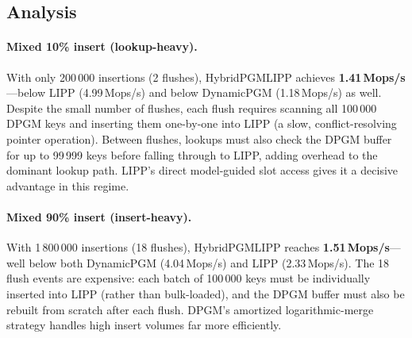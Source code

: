 \documentclass[11pt]{article}
\begin{document}
\subsection*{Analysis}

\paragraph{Mixed 10\% insert (lookup-heavy).}
With only 200\,000 insertions (2 flushes), HybridPGMLIPP achieves \textbf{1.41\,Mops/s}---below
LIPP (4.99\,Mops/s) and below DynamicPGM (1.18\,Mops/s) as well.
Despite the small number of flushes, each flush requires scanning all 100\,000 DPGM keys and
inserting them one-by-one into LIPP (a slow, conflict-resolving pointer operation).
Between flushes, lookups must also check the DPGM buffer for up to 99\,999 keys before
falling through to LIPP, adding overhead to the dominant lookup path.
LIPP's direct model-guided slot access gives it a decisive advantage in this regime.

\paragraph{Mixed 90\% insert (insert-heavy).}
With 1\,800\,000 insertions (18 flushes), HybridPGMLIPP reaches \textbf{1.51\,Mops/s}---well
below both DynamicPGM (4.04\,Mops/s) and LIPP (2.33\,Mops/s).
The 18 flush events are expensive: each batch of 100\,000 keys must be individually inserted
into LIPP (rather than bulk-loaded), and the DPGM buffer must also be rebuilt from scratch
after each flush.
DPGM's amortized logarithmic-merge strategy handles high insert volumes far more efficiently.
\end{document}
